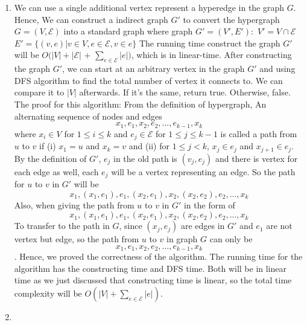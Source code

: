 \documentclass[11pt]{article}
\begin{document}
\begin{solution}
$$  $$
\begin{enumerate}
    \item  
        We can use a single additional vertex represent a hyperedge in the graph $G$. Hence, We can construct a indirect graph $G'$ to convert the hypergraph $G = (V,\mathcal{E})$ into a standard graph where graph $G' = (V',E'):$
        \newline
        $ V' = V \cap \mathcal{E}$
        \newline
        $ E' = \{(v,e) | v\in V, e \in \mathcal{E},v \in e \}$
        \newline
        The running time construct the graph $G'$ will be $O(|V| + |\mathcal{E}|$ + $\sum_{e \in \mathcal{E}} |e|)$, which is in linear-time. 
        \newline 
        After constructing the graph $G'$, we can start at an arbitrary vertex in the graph $G'$ and using DFS algorithm to find the total number of vertex it connects to. We can compare it to $|V|$ afterwards. If it's the same, return true. Otherwise, false. 
        \newline
        The proof for this algorithm:
        \newline
        From the definition of hypergraph, An alternating sequence of nodes and edges 
        $$x_1,e_1,x_2,e_2,\ldots,e_{k-1},x_k$$
        where $x_i \in V$ for $1 \le i \le k$ and $e_j \in \mathcal{E}$ for $1 \le j \le k-1$ is called a path from $u$ to $v$ if (i) $x_1 = u$ and $x_k = v$ and (ii) for $1 \le j < k$, $x_j \in e_j$ and $x_{j+1} \in e_j$. By the definition of $G'$, $e_j$ in the old path is $(v_j,e_j)$ and there is vertex for each edge as well, each $e_j$ will be a vertex representing an edge. So the path for $u$ to $v$ in $G'$ will be 
        $$x_1,(x_1,e_1),e_1,(x_2,e_1),x_2,(x_2,e_2),e_2,...,x_k$$
        Also, when giving the path from $u$ to $v$ in $G'$ in the form of 
        $$x_1,(x_1,e_1),e_1,(x_2,e_1),x_2,(x_2,e_2),e_2,...,x_k$$
        To transfer to the path in $G$, since $(x_j,e_j)$ are edges in $G'$ and $e_1$ are not vertex but edge, so the path from $u$ to $v$ in graph $G$ can only be 
        $$x_1,e_1,x_2,e_2,\ldots,e_{k-1},x_k$$.
        Hence, we proved the correctness of the algorithm. The running time for the algorithm has the constructing time and DFS time. Both will be in linear time as we just discussed that constructing time is linear, so the total time complexity will be $O(|V| + \sum_{e \in \mathcal{E}} |e|)$.
    \item

\end{enumerate}
\end{solution}
\end{document}
